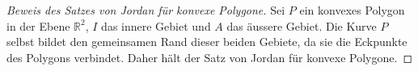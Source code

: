 \begin{proof}[Beweis des Satzes von Jordan für konvexe Polygone\label{jordan:beweis:jordan_konvexe_polygone}]

    Sei $P$ ein konvexes Polygon in der Ebene $\mathbb{R}^2$, $I$ das innere Gebiet und $A$ das äussere Gebiet. 
    Die Kurve $P$ selbst bildet den gemeinsamen Rand dieser beiden Gebiete, da sie die Eckpunkte des Polygons verbindet. 
    Daher hält der Satz von Jordan für konvexe Polygone.

\end{proof}